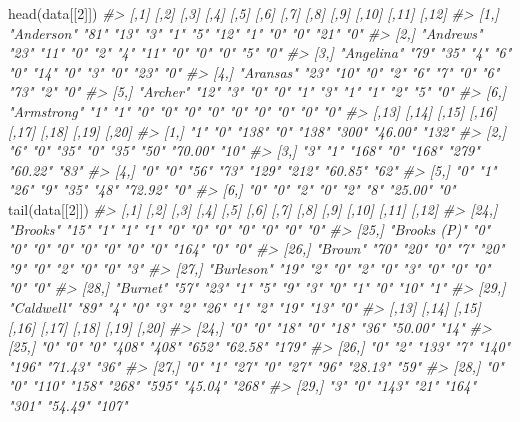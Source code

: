 \documentclass[
]{krantz}
\makeatletter
\newenvironment{Shaded}{\begin{snugshade}}{\end{snugshade}}
\newcommand{\CommentTok}[1]{\textcolor[rgb]{0.37,0.37,0.37}{\textit{#1}}}
\newcommand{\DecValTok}[1]{\textcolor[rgb]{0.06,0.06,0.06}{#1}}
\newcommand{\FunctionTok}[1]{\textcolor[rgb]{0,0,0}{#1}}
\newcommand{\NormalTok}[1]{#1}
\newenvironment{kframe}{%
\medskip{}
\setlength{\fboxsep}{.8em}
 \def\at@end@of@kframe{}%
 \ifinner\ifhmode%
  \def\at@end@of@kframe{\end{minipage}}%
  \begin{minipage}{\columnwidth}%
 \fi\fi%
 \def\FrameCommand##1{\hskip\@totalleftmargin \hskip-\fboxsep
 \colorbox{shadecolor}{##1}\hskip-\fboxsep
     \hskip-\linewidth \hskip-\@totalleftmargin \hskip\columnwidth}%
 \MakeFramed {\advance\hsize-\width
   \@totalleftmargin\z@ \linewidth\hsize
   \@setminipage}}%
 {\par\unskip\endMakeFramed%
 \at@end@of@kframe}
\renewenvironment{Shaded}{\begin{kframe}}{\end{kframe}}
\makeatother
\begin{document}
\begin{Shaded}
\begin{Highlighting}[]
\FunctionTok{head}\NormalTok{(data[[}\DecValTok{2}\NormalTok{]])}
\CommentTok{\#\textgreater{}      [,1]        [,2] [,3] [,4] [,5] [,6] [,7] [,8] [,9] [,10] [,11] [,12]}
\CommentTok{\#\textgreater{} [1,] "Anderson"  "81" "13" "3"  "1"  "5"  "12" "1"  "0"  "0"   "21"  "0"  }
\CommentTok{\#\textgreater{} [2,] "Andrews"   "23" "11" "0"  "2"  "4"  "11" "0"  "0"  "0"   "5"   "0"  }
\CommentTok{\#\textgreater{} [3,] "Angelina"  "79" "35" "4"  "6"  "0"  "14" "0"  "3"  "0"   "23"  "0"  }
\CommentTok{\#\textgreater{} [4,] "Aransas"   "23" "10" "0"  "2"  "6"  "7"  "0"  "6"  "73"  "2"   "0"  }
\CommentTok{\#\textgreater{} [5,] "Archer"    "12" "3"  "0"  "0"  "1"  "3"  "1"  "1"  "2"   "5"   "0"  }
\CommentTok{\#\textgreater{} [6,] "Armstrong" "1"  "1"  "0"  "0"  "0"  "0"  "0"  "0"  "0"   "0"   "0"  }
\CommentTok{\#\textgreater{}      [,13] [,14] [,15] [,16] [,17] [,18] [,19]   [,20]}
\CommentTok{\#\textgreater{} [1,] "1"   "0"   "138" "0"   "138" "300" "46.00" "132"}
\CommentTok{\#\textgreater{} [2,] "6"   "0"   "35"  "0"   "35"  "50"  "70.00" "10" }
\CommentTok{\#\textgreater{} [3,] "3"   "1"   "168" "0"   "168" "279" "60.22" "83" }
\CommentTok{\#\textgreater{} [4,] "0"   "0"   "56"  "73"  "129" "212" "60.85" "62" }
\CommentTok{\#\textgreater{} [5,] "0"   "1"   "26"  "9"   "35"  "48"  "72.92" "0"  }
\CommentTok{\#\textgreater{} [6,] "0"   "0"   "2"   "0"   "2"   "8"   "25.00" "0"}
\FunctionTok{tail}\NormalTok{(data[[}\DecValTok{2}\NormalTok{]])}
\CommentTok{\#\textgreater{}       [,1]         [,2] [,3] [,4] [,5] [,6] [,7] [,8] [,9] [,10] [,11] [,12]}
\CommentTok{\#\textgreater{} [24,] "Brooks"     "15" "1"  "1"  "1"  "0"  "0"  "0"  "0"  "0"   "0"   "0"  }
\CommentTok{\#\textgreater{} [25,] "Brooks (P)" "0"  "0"  "0"  "0"  "0"  "0"  "0"  "0"  "164" "0"   "0"  }
\CommentTok{\#\textgreater{} [26,] "Brown"      "70" "20" "0"  "7"  "20" "9"  "0"  "2"  "0"   "0"   "3"  }
\CommentTok{\#\textgreater{} [27,] "Burleson"   "19" "2"  "0"  "2"  "0"  "3"  "0"  "0"  "0"   "0"   "0"  }
\CommentTok{\#\textgreater{} [28,] "Burnet"     "57" "23" "1"  "5"  "9"  "3"  "0"  "1"  "0"   "10"  "1"  }
\CommentTok{\#\textgreater{} [29,] "Caldwell"   "89" "4"  "0"  "3"  "2"  "26" "1"  "2"  "19"  "13"  "0"  }
\CommentTok{\#\textgreater{}       [,13] [,14] [,15] [,16] [,17] [,18] [,19]   [,20]}
\CommentTok{\#\textgreater{} [24,] "0"   "0"   "18"  "0"   "18"  "36"  "50.00" "14" }
\CommentTok{\#\textgreater{} [25,] "0"   "0"   "0"   "408" "408" "652" "62.58" "179"}
\CommentTok{\#\textgreater{} [26,] "0"   "2"   "133" "7"   "140" "196" "71.43" "36" }
\CommentTok{\#\textgreater{} [27,] "0"   "1"   "27"  "0"   "27"  "96"  "28.13" "59" }
\CommentTok{\#\textgreater{} [28,] "0"   "0"   "110" "158" "268" "595" "45.04" "268"}
\CommentTok{\#\textgreater{} [29,] "3"   "0"   "143" "21"  "164" "301" "54.49" "107"}
\end{Highlighting}
\end{Shaded}
\end{document}
